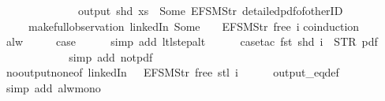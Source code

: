 \begin{isabellebody}
\ \ \ \ \ \ \ \ \ \ \ \ \ \ output\ {\isacharparenleft}shd\ xs{\isacharparenright}\ {\isasymnoteq}\ {\isacharbrackleft}Some\ {\isacharparenleft}EFSM{\isachardot}Str\ {\isacharprime}{\isacharprime}detailed{\isacharunderscore}pdf{\isacharunderscore}of{\isacharunderscore}otherID{\isacharprime}{\isacharprime}{\isacharparenright}{\isacharbrackright}{\isacharparenright}\isanewline
\ \ \ \ \ {\isacharparenleft}make{\isacharunderscore}full{\isacharunderscore}observation\ linkedIn\ {\isacharparenleft}Some\ {}{\isacharparenright}\ {\isacharparenleft}{\isacharless}{\isachargreater}{\isacharparenleft}{}\ {\isacharcolon}{\isacharequal}\ EFSM{\isachardot}Str\ {\isacharprime}{\isacharprime}free{\isacharprime}{\isacharprime}{\isacharparenright}{\isacharparenright}\ i{\isacharparenright}{\isachardoublequoteclose}\isanewline
%
\isadelimproof
%
\endisadelimproof
%
\isatagproof
{}\isamarkupfalse%
{\isacharparenleft}coinduction{\isacharparenright}\isanewline
\ \ \isamarkupfalse%
\ alw\isanewline
\ \ \isamarkupfalse%
\ \isamarkupfalse%
\ {\isacharquery}case\isanewline
\ \ \ \ \isamarkupfalse%
\ {\isacharparenleft}simp\ add{\isacharcolon}\ ltl{\isacharunderscore}step{\isacharunderscore}alt{\isacharparenright}\isanewline
\ \ \ \ \isamarkupfalse%
\ {\isacharparenleft}case{\isacharunderscore}tac\ {\isachardoublequoteopen}fst\ {\isacharparenleft}shd\ i{\isacharparenright}\ {\isacharequal}\ STR\ {\isacharprime}{\isacharprime}pdf{\isacharprime}{\isacharprime}{\isachardoublequoteclose}{\isacharparenright}\isanewline
\ \ \ \ \ \isamarkupfalse%
\isanewline
\ \ \ \ \ \isamarkupfalse%
\ {\isacharparenleft}simp\ add{\isacharcolon}\ not{\isacharunderscore}pdf{\isacharunderscore}{}\ {\isacharparenright}\isanewline
\ \ \ \ \isamarkupfalse%
\ no{\isacharunderscore}output{\isacharunderscore}none{\isacharbrackleft}of\ linkedIn\ {\isachardoublequoteopen}{\isacharparenleft}{\isacharless}{\isachargreater}{\isacharparenleft}{}\ {\isacharcolon}{\isacharequal}\ EFSM{\isachardot}Str\ {\isacharprime}{\isacharprime}free{\isacharprime}{\isacharprime}{\isacharparenright}{\isacharparenright}{\isachardoublequoteclose}\ {\isachardoublequoteopen}{\isacharparenleft}stl\ i{\isacharparenright}{\isachardoublequoteclose}{\isacharbrackright}\isanewline
\ \ \ \ \isamarkupfalse%
\ output_eq{\isacharunderscore}def\isanewline
\ \ \ \ \ \isamarkupfalse%
\ {\isacharparenleft}simp\ add{\isacharcolon}\ alw{\isacharunderscore}mono{\isacharparenright}\isanewline

\end{isabellebody}
